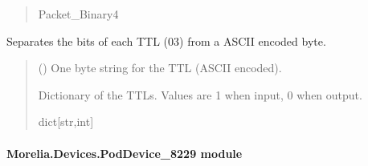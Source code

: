 \documentclass[letterpaper,10pt,english]{sphinxmanual}
\begin{document}
\begin{fulllineitems}
\begin{fulllineitems}
\begin{quote}
\begin{description}
\sphinxAtStartPar
Packet\_Binary4

\end{description}\end{quote}

\end{fulllineitems}


\begin{fulllineitems}
\label{\detokenize{Morelia.Devices:Morelia.Devices.PodDevice_8206HR.Pod8206HR._TranslateTTLbyte_ASCII}}
\pysigstartsignatures
{}
\pysigstopsignatures
\sphinxAtStartPar
Separates the bits of each TTL (0\sphinxhyphen{}3) from a ASCII encoded byte.
\begin{quote}\begin{description}
\sphinxAtStartPar
{} () \textendash{} One byte string for the TTL (ASCII encoded).

\sphinxAtStartPar
Dictionary of the TTLs. Values are 1 when input, 0 when output.

\sphinxAtStartPar
dict{[}str,int{]}

\end{description}\end{quote}

\end{fulllineitems}


\end{fulllineitems}



\paragraph{Morelia.Devices.PodDevice\_8229 module}
\label{\detokenize{Morelia.Devices:module-Morelia.Devices.PodDevice_8229}}\label{\detokenize{Morelia.Devices:morelia-devices-poddevice-8229-module}}
\end{document}

